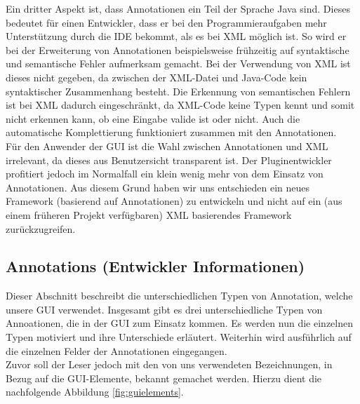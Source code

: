 \documentclass[a4paper, 11pt]{article} %
\begin{document}
Ein dritter Aspekt ist, dass Annotationen ein Teil der Sprache Java sind. Dieses bedeutet für einen Entwickler, dass er bei den Programmieraufgaben mehr Unterstützung durch die IDE bekommt, als es bei XML möglich ist. So wird er bei der Erweiterung von Annotationen beispielsweise frühzeitig auf syntaktische und semantische Fehler aufmerksam gemacht. Bei der Verwendung von XML ist dieses nicht gegeben, da zwischen der XML-Datei und Java-Code kein syntaktischer Zusammenhang besteht. Die Erkennung von semantischen Fehlern ist bei XML dadurch eingeschränkt, da XML-Code keine Typen kennt und somit nicht erkennen kann, ob eine Eingabe valide ist oder nicht. Auch die automatische Komplettierung funktioniert zusammen mit den Annotationen.\\

Für den Anwender der GUI ist die Wahl zwischen Annotationen und XML irrelevant, da dieses aus Benutzersicht transparent ist. Der Pluginentwickler profitiert jedoch im Normalfall ein klein wenig mehr von dem Einsatz von Annotationen. Aus diesem Grund haben wir uns entschieden ein neues Framework (basierend auf Annotationen) zu entwickeln und nicht auf ein (aus einem früheren Projekt verfügbaren) XML basierendes Framework zurückzugreifen.



\newpage
\subsection{Annotations (Entwickler Informationen)} %
\label{sub:annotations}
Dieser Abschnitt beschreibt die unterschiedlichen Typen von Annotation, welche unsere GUI verwendet. Insgesamt gibt es drei unterschiedliche Typen von Annoationen, die in der GUI zum Einsatz kommen. Es werden nun die einzelnen Typen motiviert und ihre Unterschiede erläutert. Weiterhin wird ausführlich auf die einzelnen Felder der Annotationen eingegangen.\\

Zuvor soll der Leser jedoch mit den von uns verwendeten Bezeichnungen, in Bezug auf die GUI-Elemente, bekannt gemachet werden. Hierzu dient die nachfolgende Abbildung \ref{fig:guielements}. 
\end{document}
